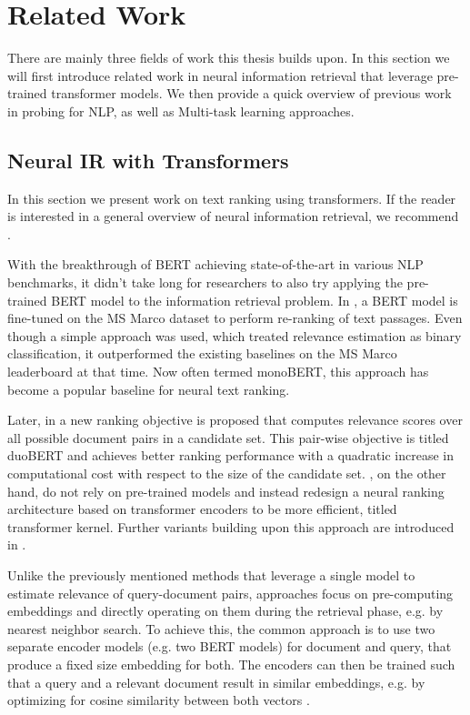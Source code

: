 \chapter{Related Work}
\label{chap:prev}
There are mainly three fields of work this thesis builds upon. In this section we will first introduce related work in neural information retrieval that leverage pre-trained transformer models. We then provide a quick overview of previous work in probing for NLP, as well as Multi-task learning approaches.

\section{Neural IR with Transformers}
In this section we present work on text ranking using transformers. If the reader is interested in a general overview of neural information retrieval, we recommend \citep{Onal2017NeuralIR, mitra2018an, Guo2020ADL}.

With the breakthrough of BERT \citep{devlin-etal-2019-bert} achieving state-of-the-art in various NLP benchmarks, it didn't take long for researchers to also try applying the pre-trained BERT model to the information retrieval problem. In \citep{Nogueira2019PassageRW}, a BERT model is fine-tuned on the MS Marco dataset \citep{DBLP:journals/corr/NguyenRSGTMD16} to perform re-ranking of text passages. Even though a simple approach was used, which treated relevance estimation as binary classification, it outperformed the existing baselines on the MS Marco leaderboard at that time. Now often termed monoBERT, this approach has become a popular baseline for neural text ranking.

Later, in \citep{Nogueira2019MultiStageDR} a new ranking objective is proposed that computes relevance scores over all possible document pairs in a candidate set. This pair-wise objective is titled duoBERT and achieves better ranking performance with a quadratic increase in computational cost with respect to the size of the candidate set. \citet{DBLP:journals/corr/abs-1912-01385}, on the other hand, do not rely on pre-trained models and instead redesign a neural ranking architecture based on transformer encoders to be more efficient, titled transformer kernel. Further variants building upon this approach are introduced in \citep{Hofsttter2020LocalSO, 10.1145/3404835.3463049}.

Unlike the previously mentioned methods that leverage a single model to estimate relevance of query-document pairs,  approaches focus on pre-computing embeddings and directly operating on them during the retrieval phase, e.g. by nearest neighbor search. To achieve this, the common approach is to use two separate encoder models (e.g. two BERT models) for document and query, that produce a fixed size embedding for both. The encoders can then be trained such that a query and a relevant document result in similar embeddings, e.g. by optimizing for cosine similarity between both vectors \citep{Humeau2020Poly-encoders, 10.1145/3397271.3401075, DBLP:journals/corr/abs-1908-10084}.

